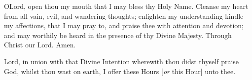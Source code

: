 \begin{enpars}
\lettrine{O} Lord, open thou my mouth that I may bless thy Holy Name. Cleanse my heart from all vain, evil, and wandering thoughts; enlighten my understanding kindle my affections, that I may pray to, and praise thee with attention and devotion; and may worthily be heard in the presence of thy Divine Majesty. Through Christ our Lord. Amen.

Lord, in union with that Divine Intention wherewith thou didst thyself praise God, whilst thou wast on earth, I offer these Hours [\textit{or} this Hour] unto thee.
\end{enpars}